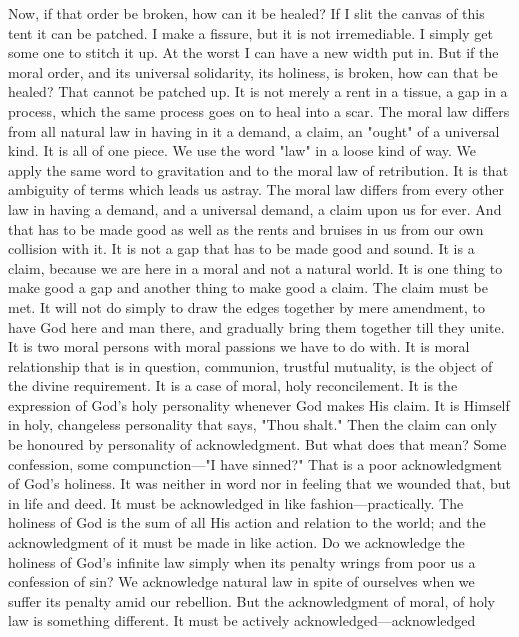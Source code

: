 \documentclass[12pt,letterpaper,oneside]{book}
\begin{document}
Now, if that order be broken, how can it be 
healed? If I slit the canvas of this tent it can 
be patched. I make a fissure, but it is not irremediable. 
I simply get some one to stitch it up. 
At the worst I can have a new width put in. But 
if the moral order, and its universal solidarity, its 
holiness, is broken, how can that be healed? 
That cannot be patched up. It is not merely a 
rent in a tissue, a gap in a process, which the 
same process goes on to heal into a scar. The 
moral law differs from all natural law in having 
in it a demand, a claim, an "ought" of a 
universal kind. It is all of one piece. We use the 
word "law" in a loose kind of way. We apply 
the same word to gravitation and to the moral 
law of retribution. It is that ambiguity of terms 
which leads us astray. The moral law differs 
from every other law in having a demand, and a 
universal demand, a claim upon us for ever. 
And that has to be made good as well as the 
rents and bruises in us from our own collision 
with it. It is not a gap that has to be made 
good and sound. It is a claim, because we are 
here in a moral and not a natural world. It is 
one thing to make good a gap and another thing 
to make good a claim. The claim must be met. 
It will not do simply to draw the edges together 
by mere amendment, to have God here and man 
there, and gradually bring them together till 
they unite. It is two moral persons with 
moral passions we have to do with. It is moral 
relationship that is in question, communion, 
trustful mutuality, is the object of the divine 
requirement. It is a case of moral, holy reconcilement. 
It is the expression of God's holy 
personality whenever God makes His claim. 
It is Himself in holy, changeless personality 
that says, "Thou shalt." Then the claim can 
only be honoured by personality of acknowledgment. 
But what does that mean? Some 
confession, some compunction---"I have sinned?" 
That is a poor acknowledgment of God's holiness. 
It was neither in word nor in feeling that 
we wounded that, but in life and deed. It must 
be acknowledged in like fashion---practically. 
The holiness of God is the sum of all His action 
and relation to the world; and the acknowledgment 
of it must be made in like action. Do we 
acknowledge the holiness of God's infinite law 
simply when its penalty wrings from poor us a 
confession of sin? We acknowledge natural 
law in spite of ourselves when we suffer its 
penalty amid our rebellion. But the acknowledgment 
of moral, of holy law is something 
different. It must be actively acknowledged---acknowledged 
\end{document}

